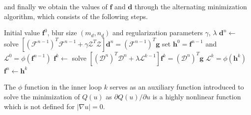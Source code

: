 \documentclass[12pt,notitlepage]{report}
\begin{document}
and finally we obtain the values of $\mathbf{f}$ and $\mathbf{d}$ through the alternating minimization algorithm, which consists of the following steps.
\begin{algorithmic}
	\REQUIRE Initial value $\mathbf{f}^0$, blur size $(m_d, n_d)$ and regularization parameters $\gamma$, $\lambda$
		\STATE $\mathbf{d}^n \gets$ solve $[(\mathcal{F}^{n - 1})^T \mathcal{F}^{n - 1} + \gamma \mathcal{Z}^T \mathcal{Z} ] \mathbf{d}^n = (\mathcal{F}^{n - 1})^T \mathbf{g}$ 
		\STATE set $\mathbf{h}^0 = \mathbf{f}^{n - 1}$ and $\mathcal{L}^0 = \phi(\mathbf{f}^{n - 1})$ 
			\STATE $\mathbf{f}^k \gets$ solve $[(\mathcal{D}^n)^T \mathcal{D}^n + \lambda \mathcal{L}^{k-1} ] \mathbf{f}^k = (\mathcal{D}^n)^T \mathbf{g}$
			\STATE $\mathcal{L}^k = \phi(\mathbf{h}^k)$
		\ENDFOR
		\STATE $\mathbf{f}^n \gets \mathbf{h}^k$
	\ENDFOR
\end{algorithmic}

The $\phi$ function in the inner loop $k$ serves as an auxiliary function introduced to solve the minimization of $Q(u)$ as $\partial Q(u) / \partial u$ is a highly nonlinear function which is not defined for $|\nabla u| = 0$. 
\end{document}
